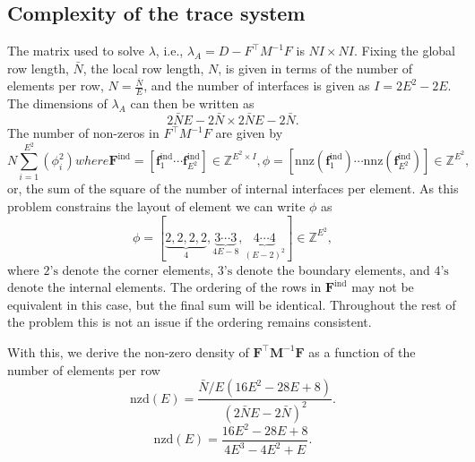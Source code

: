 



\subsection{Complexity of the trace system}

\noindent
The matrix used to solve $\lambda$, i.e., $\lambda_A = D - F^{\intercal}M^{-1}F$ is $NI \times NI$. Fixing the global row length, $\bar{N}$, the local row length, $N$, is given in terms of the number of elements per row, $N = \frac{\bar{N}}{E}$, and the number of interfaces is given as $I = 2E^2 - 2E$. The dimensions of $\lambda_A$ can then be written as 
\begin{equation}
	2\bar{N}E - 2\bar{N} \times 2\bar{N}E - 2\bar{N}. 
\end{equation}
The number of non-zeros in $F^{\intercal}M^{-1}F$ are given by
\begin{subequations}
\begin{equation}
	N \sum_{i=1}^{E^2} (\phi_i^2)
\end{equation}
where
\begin{equation}
	\textbf{F}^{\text{ind}} = \left[\textbf{f}^{\text{ind}}_1 \cdots \textbf{f}^{\text{ind}}_{E^2}\right] \in \mathbb{Z}^{E^2 \times I},
\end{equation}
\begin{equation}
	\phi = \left[ \text{nnz}(\textbf{f}^{\text{ind}}_1) \cdots \text{nnz}(\textbf{f}^{\text{ind}}_{E^2}) \right] \in \mathbb{Z}^{E^2}, 
\end{equation}
\end{subequations}
or, the sum of the square of the number of internal interfaces per element. As this problem constrains the layout of element we can write $\phi$ as 
\begin{equation}
	\phi = \left[ \underbrace{2, 2, 2, 2}_{4}, \underbrace{3 \cdots 3}_{4E - 8}, \underbrace{4 \cdots 4}_{(E-2)^2} \right] \in \mathbb{Z}^{E^2}, 
\end{equation}
where $2\text{'s}$ denote the corner elements, $3\text{'s}$ denote the boundary elements, and $4\text{'s}$ denote the internal elements. The ordering of the rows in $\textbf{F}^{\text{ind}}$ may not be equivalent in this case, but the final sum will be identical. Throughout the rest of the problem this is not an issue if the ordering remains consistent. 

With this, we derive the non-zero density of $\textbf{F}^{\intercal}\textbf{M}^{-1}\textbf{F}$ as a function of the number of elements per row 
\begin{equation}
	\text{nzd}(E) = \frac{\bar{N}/E (16E^2 - 28E + 8)}{(2\bar{N}E - 2\bar{N})^2}.
\end{equation}
\begin{equation}
	\text{nzd}(E) = \frac{16E^2 - 28E + 8}{4E^3 - 4E^2 + E}.
\end{equation}

